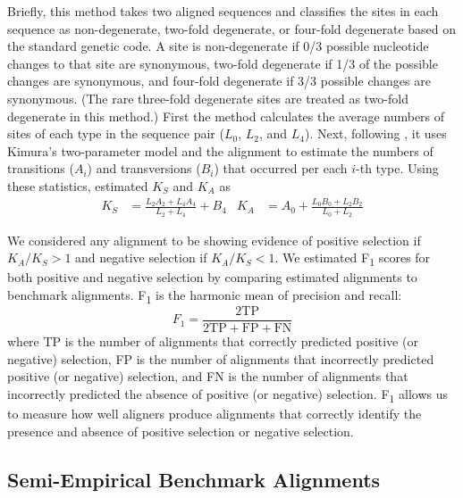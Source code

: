 \documentclass[12pt,letterpaper]{article}
\begin{document}
Briefly, this method takes two aligned sequences and classifies the sites in each sequence as non-degenerate, two-fold degenerate, or four-fold degenerate based on the standard genetic code. A site is non-degenerate if 0/3 possible nucleotide changes to that site are synonymous, two-fold degenerate if 1/3 of the possible changes are synonymous, and four-fold degenerate if 3/3 possible changes are synonymous. (The rare three-fold degenerate sites are treated as two-fold degenerate in this method.) First the method calculates the average numbers of sites of each type in the sequence pair ($L_0$, $L_2$, and $L_4$). Next, following \cite{Li1985}, it uses Kimura's two-parameter model \citep{kimura1980simple} and the alignment to estimate the numbers of transitions ($A_i$) and transversions ($B_i$) that occurred per each $i$-th type. Using these statistics, \cite{ka_ks_li_1993} estimated $K_S$ and $K_A$ as
\begin{align*}
K_S &= \frac{L_2 A_2 + L_4 A_4}{L_2 + L_4} + B_4 &
K_A &= A_0 + \frac{L_0 B_0 + L_2 B_2}{L_0 + L_2}
\end{align*}

We considered any alignment to be showing evidence of positive selection if $K_A/K_S > 1$ and negative selection if $K_A/K_S < 1$. We estimated F\textsubscript{1} scores for both positive and negative selection by comparing estimated alignments to benchmark alignments. F\textsubscript{1} is the harmonic mean of precision and recall:
\[
F_1 = \frac{2 \text{TP}}{2 \text{TP} + \text{FP} + \text{FN}}
\]
where TP is the number of alignments that correctly predicted positive (or negative) selection, FP is the number of alignments that incorrectly predicted positive (or negative) selection, and FN is the number of alignments that incorrectly predicted the absence of positive (or negative) selection. F\textsubscript{1} allows us to measure how well aligners produce alignments that correctly identify the presence and absence of positive selection or negative selection.

\subsection*{Semi-Empirical Benchmark Alignments}
\end{document}
